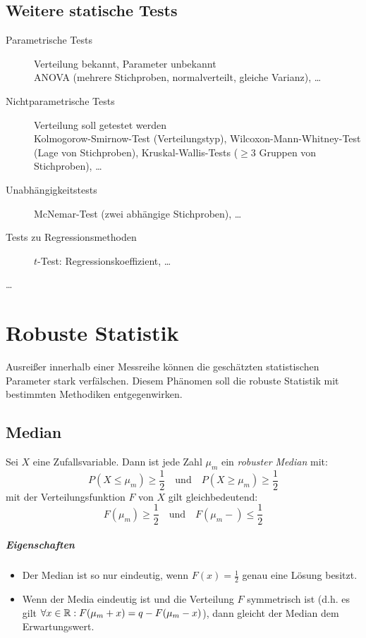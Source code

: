 	\section{Weitere statische Tests}
		\begin{description}
			\item[Parametrische Tests] Verteilung bekannt, Parameter unbekannt \\ ANOVA (mehrere Stichproben, normalverteilt, gleiche Varianz), \dots
			\item[Nichtparametrische Tests] Verteilung soll getestet werden \\ Kolmogorow-Smirnow-Test (Verteilungstyp), Wilcoxon-Mann-Whitney-Test (Lage von Stichproben), Kruskal-Wallis-Tests (\(\geq 3\) Gruppen von Stichproben), \dots
			\item[Unabhängigkeitstests] McNemar-Test (zwei abhängige Stichproben), \dots
			\item[Tests zu Regressionsmethoden] \(t\)-Test: Regressionskoeffizient, \dots
			\item[\dots]
		\end{description}

\chapter{Robuste Statistik}
	Ausreißer innerhalb einer Messreihe können die geschätzten statistischen Parameter stark verfälschen. Diesem Phänomen soll die robuste Statistik mit bestimmten Methodiken entgegenwirken.

	\section{Median}
		Sei \(X\) eine Zufallsvariable. Dann ist jede Zahl \( \mu_m \) ein \textit{robuster Median} mit:
		\begin{equation*}
			P(X \leq \mu_m) \geq \frac{1}{2} \quad \textrm{und} \quad P(X \geq \mu_m) \geq \frac{1}{2}
		\end{equation*}
		mit der Verteilungsfunktion \(F\) von \(X\) gilt gleichbedeutend:
		\begin{equation*}
			F(\mu_m) \geq \frac{1}{2} \quad \textrm{und} \quad F(\mu_m-) \leq \frac{1}{2}
		\end{equation*}

		\paragraph{Eigenschaften}
			\begin{itemize}
				\item Der Median ist so nur eindeutig, wenn \( F(x) = \frac{1}{2} \) genau eine Lösung besitzt.
				\item Wenn der Media eindeutig ist und die Verteilung \(F\) symmetrisch ist (d.h. es gilt \( \forall x \in \mathbb{R} : F(\mu_m + x) = q - F(\mu_m - x) \)), dann gleicht der Median dem Erwartungswert.
			\end{itemize}

